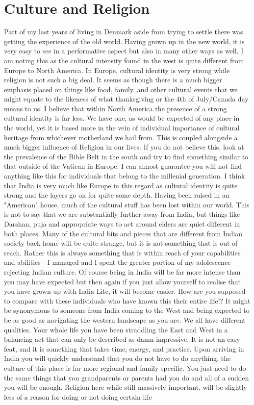 \chapter{Culture and Religion}
Part of my last years of living in Denmark aside from trying to settle there was getting the experience of the  old world. Having grown up in the new world, it is very easy to see in a performative aspect but also in many other ways as well. I am noting this as the cultural intensity found in the west is quite different from Europe to North America. In Europe, cultural identity is very strong while religion is not such a big deal. It seems as though there is a much bigger emphasis placed on things like food, family, and other cultural events that we might equate to the likeness of what thanksgiving or the 4th of July/Canada day means to us. I believe that within North America the presence of a strong cultural identity is far less. We have one, as would be expected of any place in the world, yet it is based more in the vein of individual importance of cultural heritage from whichever motherland we hail from. This is coupled alongside a much bigger influence of Religion in our lives. If you do not believe this, look at the prevalence of the Bible Belt in the south and try to find something similar to that outside of the Vatican in Europe. I can almost guarantee you will not find anything like this for individuals that belong to the millenial generation. I think that India is very much like Europe in this regard as cultural identity is quite strong and the layers go on for quite some depth. Having been raised in an "American" house, much of the cultural stuff has been lost within our world. This is not to say that we are substantially further away from India, but things like Darshan, puja and appropriate ways to act around elders are quiet different in both places. Many of the cultural bits and pieces that are different from Indian society back home will be quite strange, but it is not something that is out of reach. Rather this is always something that is within reach of your capabilities and abilities - I managed and I spent the greater portion of my adolescence rejecting Indian culture. Of course being in India will be far more intense than you may have expected but then again if you just allow yourself to realise that you have grown up with India Lite, it will become easier. How are you supposed to compare with these individuals  who have known this their entire life!? It might be synonymous to someone from India coming to the West and being expected to be as good as navigating the western landscape as you are. We all have different qualities. Your whole life you have been straddling the East and West in a balancing act that can only be described as damn impressive. It is not an easy feat, and it is something that takes time, energy, and practice. Upon arriving in India you will quickly understand that you do not have to do anything, the culture of this place is far more regional and family specific. You just need to do the same things that you grandparents or parents had you do and all of a sudden you will be enough. Religion here while still massively important, will be slightly less of a reason for doing or not doing certain life 